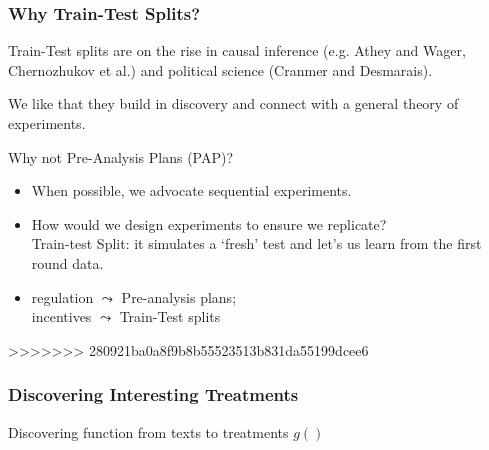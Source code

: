 \documentclass[xcolor=dvipsnames]{beamer}
\begin{document}
\begin{frame}
\frametitle{Why Train-Test Splits?}
\pause
Train-Test splits are on the rise in causal inference (e.g. Athey and Wager, Chernozhukov et al.) and political science (Cranmer and Desmarais). \\ \pause

\medskip

We like that they build in \alert{discovery} and connect with a \alert{general theory of experiments}. \pause

\medskip

Why not Pre-Analysis Plans (PAP)? \pause
\begin{itemize}
\item When possible, we advocate \alert{sequential experiments}. \pause
\item How would we design experiments to \alert{ensure we replicate}? \\ \pause
\alert{Train-test Split}: it simulates a `fresh' test and let's us learn from the first round data. \pause
\item \alert{regulation} $\leadsto$ Pre-analysis plans; \\ \pause
\alert{incentives} $\leadsto$ Train-Test splits
\end{itemize}


\end{frame}


>>>>>>> 280921ba0a8f9b8b55523513b831da55199dcee6
\begin{frame}
  \frametitle{Discovering Interesting Treatments}

\Large
  Discovering function from texts to treatments $g()$ \pause
  \begin{itemize}
     \pause
  \end{itemize}



\end{frame}

\end{document}
